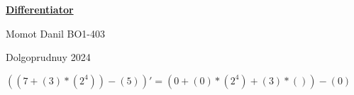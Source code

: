 \documentclass[a4paper,12pt]{article} %
\begin{document}
    \begin{titlepage}
    {\huge
    \begin{center}
    \underline{{\bf Differentiator}}
    \vspace{1cm}
    
    \end{center}
    }
    \vspace{2cm}
    \begin{center}
    
    
    {\LARGE Momot Danil
    \vspace{0.2cm}
    BO1-403}
    \end{center}
    \vspace{9.5cm}
    \begin{center}
        Dolgoprudnuy 2024
    \end{center}
    \end{titlepage}
$({({{7}+{({3})*({{2}^{4}})}})-({5})})' = {({{0}+{{({0})*({{2}^{4}})}+{({3})*()}}})-({0})}$
\end{document}
